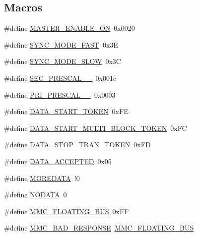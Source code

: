 \subsection*{Macros}
\begin{DoxyCompactItemize}
\item 
\#define \hyperlink{_s_d-_s_p_i_8h_ace6b34c8690ad8dd722648595d7473b5}{M\+A\+S\+T\+E\+R\+\_\+\+E\+N\+A\+B\+L\+E\+\_\+\+O\+N}~0x0020
\item 
\#define \hyperlink{_s_d-_s_p_i_8h_af70ce55e2189a8a356a6b7fbc0a8bbbd}{S\+Y\+N\+C\+\_\+\+M\+O\+D\+E\+\_\+\+F\+A\+S\+T}~0x3\+E
\item 
\#define \hyperlink{_s_d-_s_p_i_8h_a01c0deda12973422dfc3b809840cfdb1}{S\+Y\+N\+C\+\_\+\+M\+O\+D\+E\+\_\+\+S\+L\+O\+W}~0x3\+C
\item 
\#define \hyperlink{_s_d-_s_p_i_8h_a20c215901e40a67344cb2bd25ec1c01f}{S\+E\+C\+\_\+\+P\+R\+E\+S\+C\+A\+L\+\_\+\_}~0x001c
\item 
\#define \hyperlink{_s_d-_s_p_i_8h_a25444cad0178919c858e6628fdacbed8}{P\+R\+I\+\_\+\+P\+R\+E\+S\+C\+A\+L\+\_\+\_}~0x0003
\item 
\#define \hyperlink{_s_d-_s_p_i_8h_aebd3d10992cfc6f6b0abfa9715bab25b}{D\+A\+T\+A\+\_\+\+S\+T\+A\+R\+T\+\_\+\+T\+O\+K\+E\+N}~0x\+F\+E
\item 
\#define \hyperlink{_s_d-_s_p_i_8h_a953490f69e34a91ff82d7b81952396b0}{D\+A\+T\+A\+\_\+\+S\+T\+A\+R\+T\+\_\+\+M\+U\+L\+T\+I\+\_\+\+B\+L\+O\+C\+K\+\_\+\+T\+O\+K\+E\+N}~0x\+F\+C
\item 
\#define \hyperlink{_s_d-_s_p_i_8h_a4e5c010f94a0779d55fa1231759535ec}{D\+A\+T\+A\+\_\+\+S\+T\+O\+P\+\_\+\+T\+R\+A\+N\+\_\+\+T\+O\+K\+E\+N}~0x\+F\+D
\item 
\#define \hyperlink{_s_d-_s_p_i_8h_a823d1351dc20face71ca87b0f95d967d}{D\+A\+T\+A\+\_\+\+A\+C\+C\+E\+P\+T\+E\+D}~0x05
\item 
\#define \hyperlink{_s_d-_s_p_i_8h_a60c157f738d808af36cc86bd1fc4361d}{M\+O\+R\+E\+D\+A\+T\+A}~!0
\item 
\#define \hyperlink{_s_d-_s_p_i_8h_a6a2e6b3670a920656095b739efe77613}{N\+O\+D\+A\+T\+A}~0
\item 
\#define \hyperlink{_s_d-_s_p_i_8h_a1688994d563994ef1db7f32a32d97183}{M\+M\+C\+\_\+\+F\+L\+O\+A\+T\+I\+N\+G\+\_\+\+B\+U\+S}~0x\+F\+F
\item 
\#define \hyperlink{_s_d-_s_p_i_8h_a9d9e5b7981fcbb74f58cc3b69611cfb6}{M\+M\+C\+\_\+\+B\+A\+D\+\_\+\+R\+E\+S\+P\+O\+N\+S\+E}~\hyperlink{_s_d-_s_p_i_8h_a1688994d563994ef1db7f32a32d97183}{M\+M\+C\+\_\+\+F\+L\+O\+A\+T\+I\+N\+G\+\_\+\+B\+U\+S}

\end{DoxyCompactItemize}
